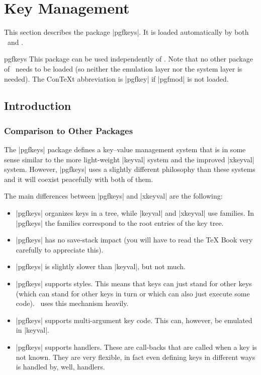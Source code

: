 %
%
%


\section{Key Management}
\label{section-keys}

This section describes the package |pgfkeys|. It is loaded automatically by
both \pgfname\ and \tikzname.

\begin{package}{pgfkeys}
    This package can be used independently of \pgfname. Note that no
    other package of \pgfname\ needs to be loaded (so neither the
    emulation layer nor the system layer is needed). The Con\TeX t
    abbreviation is |pgfkey|  if |pgfmod| is not loaded.
\end{package}


\subsection{Introduction}

\subsubsection{Comparison to Other Packages}

The |pgfkeys| package defines a key--value management system that is in some
sense similar to the more light-weight |keyval| system and the improved
|xkeyval| system. However, |pgfkeys| uses a slightly different philosophy than
these systems and it will coexist peacefully with both of them.

The main differences between |pgfkeys| and |xkeyval| are the following:
%
\begin{itemize}
    \item |pgfkeys| organizes keys in a tree, while |keyval| and |xkeyval|
        use families. In |pgfkeys| the families correspond to the root
        entries of the key tree.
    \item |pgfkeys| has no save-stack impact (you will have to read the \TeX
        Book very carefully to appreciate this).
    \item |pgfkeys| is slightly slower than |keyval|, but not much.
    \item |pgfkeys| supports styles. This means that keys can just stand for
        other keys (which can stand for other keys in turn or which can also
        just execute some code). \tikzname\ uses this mechanism heavily.
    \item |pgfkeys| supports multi-argument key code. This can, however, be
        emulated in |keyval|.
    \item |pgfkeys| supports handlers. These are call-backs that are called
        when a key is not known. They are very flexible, in fact even
        defining keys in different ways is handled by, well, handlers.
\end{itemize}


